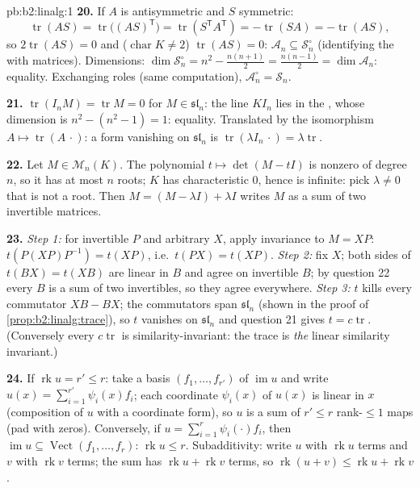\begin{solution}{pb:b2:linalg:1}
\textbf{20.} If $A$ is antisymmetric and $S$ symmetric:
\[
\operatorname{tr}(AS) = \operatorname{tr}\bigl((AS)^{\mathsf
T}\bigr) = \operatorname{tr}(S^{\mathsf T}A^{\mathsf T}) =
-\operatorname{tr}(SA) = -\operatorname{tr}(AS),
\]
so $2\operatorname{tr}(AS) = 0$ and ($\operatorname{char} K \neq
2$) $\operatorname{tr}(AS) = 0$: $\mathcal{A}_n \subseteq
\mathcal{S}_n^\circ$ (identifying the  with matrices).
Dimensions: $\dim\mathcal{S}_n^\circ = n^2 - \frac{n(n+1)}2 =
\frac{n(n-1)}2 = \dim\mathcal{A}_n$: equality. Exchanging roles
(same computation), $\mathcal{A}_n^\circ = \mathcal{S}_n$.

\textbf{21.} $\operatorname{tr}(I_nM) = \operatorname{tr} M = 0$
for $M \in \mathfrak{sl}_n$: the line $KI_n$ lies in the
, whose dimension is $n^2 - (n^2 - 1) = 1$: equality.
Translated by the isomorphism $A \mapsto
\operatorname{tr}(A\,\cdot)$: a form vanishing on
$\mathfrak{sl}_n$ is $\operatorname{tr}(\lambda I_n\,\cdot) =
\lambda\operatorname{tr}$.

\textbf{22.} Let $M \in \mathcal{M}_n(K)$. The polynomial $t
\mapsto \det(M - tI)$ is nonzero of degree $n$, so it has at most
$n$ roots; $K$ has characteristic $0$, hence is infinite: pick
$\lambda \neq 0$ that is not a root. Then $M = (M - \lambda I) +
\lambda I$ writes $M$ as a sum of two invertible matrices.

\textbf{23.} \emph{Step 1:} for invertible $P$ and arbitrary
$X$, apply invariance to $M = XP$: $t(P(XP)P^{-1}) = t(XP)$,
i.e.\ $t(PX) = t(XP)$. \emph{Step 2:} fix $X$; both sides of
$t(BX) = t(XB)$ are linear in $B$ and agree on invertible $B$;
by question 22 every $B$ is a sum of two invertibles, so they
agree everywhere. \emph{Step 3:} $t$ kills every commutator $XB
- BX$; the commutators span $\mathfrak{sl}_n$ (shown in the
proof of \cref{prop:b2:linalg:trace}), so $t$ vanishes on
$\mathfrak{sl}_n$ and question 21 gives $t =
c\operatorname{tr}$. (Conversely every $c\operatorname{tr}$ is
similarity-invariant: the trace is \emph{the} linear similarity
invariant.)

\textbf{24.} If $\operatorname{rk} u = r' \leq r$: take a basis
$(f_1, \dots, f_{r'})$ of $\operatorname{im} u$ and write $u(x)
= \sum_{i=1}^{r'} \psi_i(x) f_i$; each coordinate $\psi_i(x)$ of
$u(x)$ is linear in $x$ (composition of $u$ with a coordinate
form), so $u$ is a sum of $r' \leq r$ rank-$\leq1$ maps (pad
with zeros). Conversely, if $u = \sum_{i=1}^r \psi_i(\cdot)f_i$,
then $\operatorname{im} u \subseteq \operatorname{Vect}(f_1,
\dots, f_r)$: $\operatorname{rk} u \leq r$. Subadditivity: write
$u$ with $\operatorname{rk} u$ terms and $v$ with
$\operatorname{rk} v$ terms; the sum has $\operatorname{rk} u +
\operatorname{rk} v$ terms, so $\operatorname{rk}(u + v) \leq
\operatorname{rk} u + \operatorname{rk} v$.


\end{solution}
